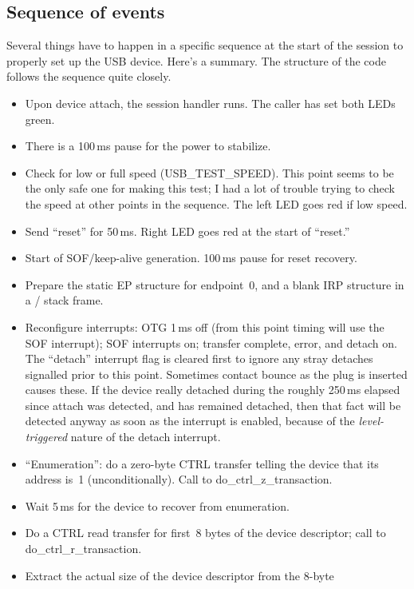 \subsection{Sequence of events}

Several things have to happen in a specific sequence at the start of the
session to properly set up the USB device.  Here's a summary.  The structure
of the code follows the sequence quite closely.

\begin{itemize}
  \item Upon device attach, the session handler runs.  The caller has set
    both LEDs green.
  \item There is a 100\,ms pause for the power to stabilize.
  \item Check for low or full speed (USB\_TEST\_SPEED).  This point seems to
    be the only safe one for making this test; I had a lot of trouble trying
    to check the speed at other points in the sequence.  The left LED goes
    red if low speed.
  \item Send ``reset'' for 50\,ms.  Right LED goes red at the start of
    ``reset.''
  \item Start of SOF/keep-alive generation.  100\,ms pause for reset
    recovery.
  \item Prepare the static EP structure for endpoint~0, and a blank IRP
    structure in a / stack frame.
  \item Reconfigure interrupts:  OTG 1\,ms off (from this point timing will
    use the SOF interrupt); SOF interrupts on; transfer complete, error, and
    detach on.  The ``detach'' interrupt flag is cleared first to ignore any
    stray detaches signalled prior to this point.  Sometimes contact bounce
    as the plug is inserted causes these.  If the device really detached
    during the roughly 250\,ms elapsed since attach was detected, and has
    remained detached, then that fact will be detected anyway as soon as the
    interrupt is enabled, because of the \emph{level-triggered} nature of
    the detach interrupt.
  \item ``Enumeration'':  do a zero-byte CTRL transfer telling the device
    that its address is~1 (unconditionally).  Call to do\_ctrl\_z\_transaction.
  \item Wait 5\,ms for the device to recover from enumeration.
  \item Do a CTRL read transfer for first~8 bytes of the device
    descriptor; call to do\_ctrl\_r\_transaction.
  \item Extract the actual size of the device descriptor from the 8-byte

\end{itemize}
